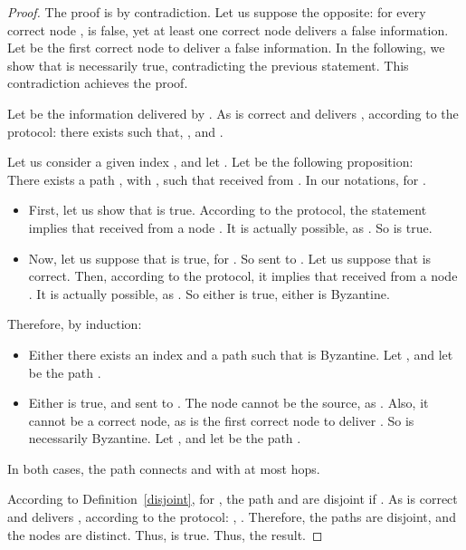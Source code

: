 \documentclass[a4paper,11pt]{article}
\begin{document}
\begin{proof}
The proof is by contradiction. Let us suppose the opposite: for every correct node ,  is false, yet at least one correct node delivers a false information.
Let  be the first correct node to deliver a false information.
In the following, we show that  is necessarily true, contradicting the previous statement. This contradiction achieves the proof.


Let  be the information delivered by .
As  is correct and delivers , according to the protocol: there exists  such that,
,  and .


Let us consider a given index , and let . Let  be the following proposition:
\\There exists a path , with , such that  received  from .
In our notations,  for .

\begin{itemize}

\item First, let us show that  is true.
According to the protocol, the statement  implies that  received  from a node .
It is actually possible, as .
So  is true.

\item  Now, let us suppose that  is true, for .
So  sent  to . Let us suppose that  is correct. Then, according to the protocol, it implies that 
 received  from a node .
It is actually possible, as . So either  is true, either  is Byzantine.
\end{itemize}


Therefore, by induction:

\begin{itemize}
\item Either there exists an index  and a path  such that  is Byzantine. Let , and let  be the path .

\item Either  is true, and  sent  to .
The node  cannot be the source, as . Also, it cannot be a correct node, as  is the first correct node to deliver .
So  is necessarily Byzantine. Let , and let  be the path .
\end{itemize}

In both cases, the path  connects  and  with at most  hops.



According to Definition~\ref{disjoint}, for , the path  and  are disjoint if .
As  is correct and delivers , according to the protocol: , .
Therefore, the paths  are disjoint, and the nodes  are distinct. Thus,  is true. Thus, the result.


\end{proof}
\end{document}
